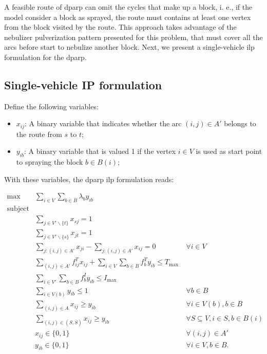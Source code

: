 \documentclass[a4paper,11pt]{article}
\begin{document}
A feasible route of \gls{dparp} can omit the cycles that make up a block, i. e.,
if the model consider  a block as sprayed, the route must  contains at least one
vertex from the block visited by the route. This approach takes advantage of the
nebulizer pulverization pattern presented for  this problem, that must cover all
the  arcs  before  start  to  nebulize   another  block.  Next,  we  present  a
single-vehicle \gls{ilp} formulation for the \gls{dparp}.

\newpage
\subsection{Single-vehicle IP formulation}

Define the following variables:

\begin{itemize}
  \item $x_{ij}$: A binary variable that indicates whether the arc $(i, j) \in
    A'$ belongs to the route from $s$ to $t$;
  \item $y_{ib}$: A binary variable that is valued 1 if the vertex $i \in V$ is
    used as start point to spraying the block $b \in B(i)$; 
\end{itemize}
With these variables, the \gls{dparp} \gls{ilp} formulation reads:

\begin{align}
  \max & \sum_{i \in V} \sum_{b \in B} \lambda_b y_{ib} & \label{eq:of}\\
  \nonumber \text{subject to:} & & \\
       & \sum_{j \in V'\backslash \{t\}} x_{sj} = 1 & \label{eq:s-all} \\
       & \sum_{j \in V'\backslash \{s\}} x_{jt} = 1 & \label{eq:all-t} \\
       & \sum_{j: (i, j) \in A'} x_{ji} - \sum_{j: (i, j) \in A'} x_{ij} = 0 & \ \forall i \in V \label{eq:flow-conservation} \\
       & \sum_{(i, j) \in A'} f^T_{ij} x_{ij} + \sum_{i \in V} \sum_{b \in B} f^T_b y_{ib} \leq T_{\max} & \label{eq:max-time} \\
       & \sum_{i \in V'} \sum_{b \in B} f^I_b y_{ib} \leq I_{\max} & \label{eq:max-insecticide} \\
       & \sum_{i \in V(b)} y_{ib} \leq 1 & \ \forall b \in B \label{eq:max-attend} \\
       & \sum_{(i, j) \in A} x_{ij} \geq y_{ib} & \ \forall i \in V(b), b \in B \label{eq:in-path} \\
       & \sum_{(i, j) \in (S, \bar{S})} x_{ij} \geq y_{ib} & \ \forall S \subseteq V, i \in S, b \in B(i) \label{eq:subtour-elimination} \\
       & x_{ij} \in \{0, 1\} & \ \forall (i, j) \in A' \label{eq:dom-x} \\
       & y_{ib} \in \{0, 1\} & \ \forall i \in V, b \in B. \label{eq:dom-y} 
\end{align}
\end{document}
